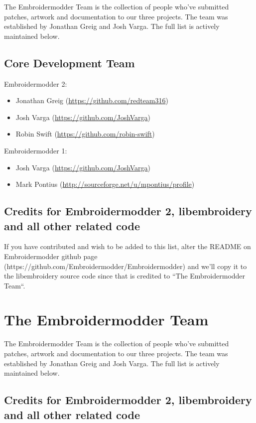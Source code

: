 \documentclass[11pt]{report}
\begin{document}
The Embroidermodder Team is the collection of people who've submitted
patches, artwork and documentation to our three projects.
The team was established by Jonathan Greig and Josh Varga.
The full list is actively maintained below.

\subsection{Core Development Team}

Embroidermodder 2:

\begin{itemize}
\item Jonathan Greig (\url{https://github.com/redteam316})
\item Josh Varga (\url{https://github.com/JoshVarga})
\item Robin Swift (\url{https://github.com/robin-swift})
\end{itemize}

Embroidermodder 1:

\begin{itemize}
\item Josh Varga (\url{https://github.com/JoshVarga})
\item Mark Pontius (\url{http://sourceforge.net/u/mpontius/profile})
\end{itemize}

\subsection{Credits for Embroidermodder 2, libembroidery and all other related code}

If you have contributed and wish to be added to this list, alter the  README on Embroidermodder
github page (https://github.com/Embroidermodder/Embroidermodder) and we'll copy it to the
libembroidery source code since that is credited to ``The Embroidermodder Team``.

\section{The Embroidermodder Team}

The Embroidermodder Team is the collection of people who've submitted
patches, artwork and documentation to our three projects.
The team was established by Jonathan Greig and Josh Varga.
The full list is actively maintained below.

\subsection{Credits for Embroidermodder 2, libembroidery and all other related code}
\label{credits-for-embroidermodder-2-libembroidery-and-all-other-related-code}
\end{document}

